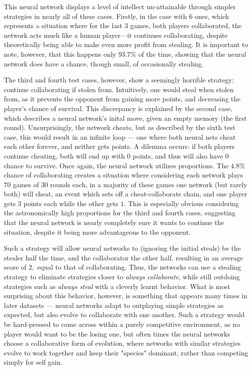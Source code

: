 \documentclass{article}
\begin{document}
This neural network displays a level of intellect un-attainable through simpler strategies in nearly all of these cases. Firstly, in the case with $6$ ones, which represents a situation where for the last $3$ games, both players collaborated, the network acts much like a human player---it continues collaborating, despite theoretically being able to make even more profit from stealing. It is important to note, however, that this happens only $93.7\%$ of the time, showing that the neural network does have a chance, though small, of occasionally stealing.

The third and fourth test cases, however, show a seemingly horrible strategy: continue collaborating if stolen from. Intuitively, one would steal when stolen from, as it prevents the opponent from gaining more points, and decreasing the player's chance of survival. This discrepancy is explained by the second case, which describes a neural network's inital move, given an empty memory (the first round). Unsurprisingly, the network cheats, but as described by the sixth test case, this would result in an infinite loop --- one where both neural nets cheat each other forever, and neither gets points. A dilemma occurs: if both players continue cheating, both will end up with $0$ points, and thus will also have $0$ chance to survive. Once again, the neural network utilizes proportions. The $4.8\%$ chance of collaborating creates a situation where considering each network plays $70$ games of $30$ rounds each, in a majority of these games one network (but rarely both) will cheat, an event which sets off a cheat-collaborate chain, and one player gets $3$ points each while the other gets $1$. This is especially obvious considering the astronomically high proportions for the third and fourth cases, suggesting that the neural network is nearly completely sure it wants to continue the situation, despite it being more advantageous to the opponent. 

Such a strategy will allow neural networks to (ignoring the initial steals) be the stealer half the time, and the collaborator the other half, resulting in an average score of $2,$ equal to that of collaborating. Thus, the networks can use a stealing strategy to eliminate strategies closer to \textit{always collaborate}, while still outdoing strategies such as \textit{always steal} with a cleverly learnt behavior. What is most surprising about this behavior, however, is something that appears many times in later datasets --- neural networks adapt to outplaying simple strategies as expected, but also evolve to collaborate with one another. Such a strategy would be hard-pressed to come across within a purely competitive environment, as no player would want to be the losing one, but often times the neural networks choose a collaborative form of evolution, where networks with similar strategies evolve to work together and keep their "species" dominant, rather than competing simply for self gain.
\end{document}
